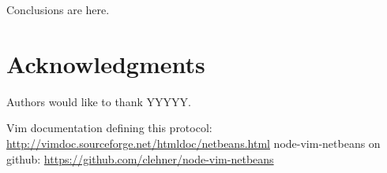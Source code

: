 \documentclass{llncs}
\begin{document}
Conclusions are here.

\section*{Acknowledgments}\label{sec:Acknowledgments}

Authors would like to thank YYYYY.

\begin{thebibliography}{1}

Vim documentation defining this protocol: \url{http://vimdoc.sourceforge.net/htmldoc/netbeans.html}
node-vim-netbeans on github: \url{https://github.com/clehner/node-vim-netbeans}

\end{thebibliography}
\end{document}
